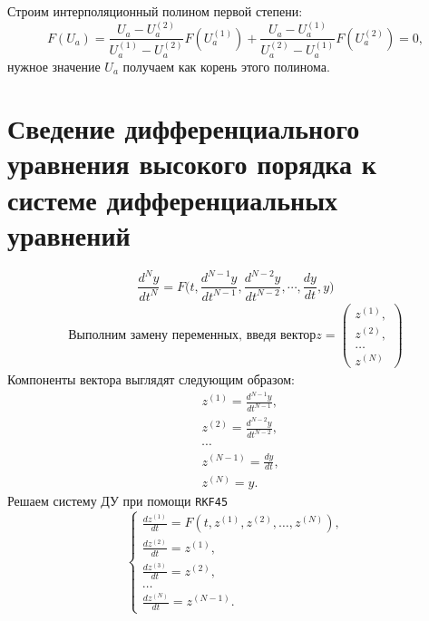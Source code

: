 \documentclass[a4paper,11pt]{article}
\begin{document}
\noindent Строим интерполяционный полином первой степени:
\begin{equation*}
  F(U_a) = \frac{U_a - U_a^{(2)}}{U_a^{(1)} - U_a^{(2)}} F(U_a^{(1)}) + \frac{U_a - U_a^{(1)}}{U_a^{(2)} - U_a^{(1)}} F(U_a^{(2)}) = 0,
\end{equation*}
нужное значение $U_a$ получаем как корень этого полинома.

\section{Сведение дифференциального уравнения высокого порядка к системе дифференциальных уравнений}
\begin{equation*}
  \frac{d^Ny}{dt^N} = F\bigg( t, \frac{d^{N-1}y}{dt^{N-1}}, \frac{d^{N-2}y}{dt^{N-2}}, \cdots, \frac{dy}{dt}, y \bigg)
\end{equation*}
\begin{gather*}
  \text{Выполним замену переменных, введя вектор}
  z = \begin{pmatrix}
    z^{(1)}, \\ z^{(2)}, \\ \dots \\ z^{(N)}
  \end{pmatrix}
\end{gather*}
Компоненты вектора выглядят следующим образом:
\begin{align*}
  & z^{(1)} = \frac{d^{N-1}y}{dt^{N-1}}, \\
  & z^{(2)} = \frac{d^{N-2}y}{dt^{N-2}}, \\
  & \cdots \\
  & z^{(N-1)} = \frac{dy}{dt}, \\
  & z^{(N)} = y.
\end{align*}
Решаем систему ДУ при помощи \verb|RKF45|
\begin{equation*}
  \begin{cases}
    \frac{dz^{(1)}}{dt} = F(t, z^{(1)}, z^{(2)}, \dots, z^{(N)}), \\
    \frac{dz^{(2)}}{dt} = z^{(1)}, \\
    \frac{dz^{(3)}}{dt} = z^{(2)}, \\
    \dots \\
    \frac{dz^{(N)}}{dt} = z^{(N-1)}.
  \end{cases}
\end{equation*}
\end{document}

